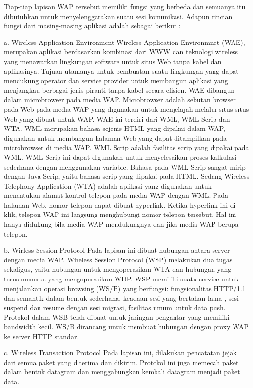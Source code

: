 \documentclass{jtetiproposalskripsi}
\begin{document}
Tiap-tiap lapisan WAP tersebut memiliki fungsi yang berbeda dan semuanya itu dibutuhkan untuk menyelenggarakan suatu sesi komunikasi. Adapun rincian fungsi dari masing-masing aplikasi adalah sebagai berikut :
	
	
a.	Wireless Application Environment
Wireless Application Environmnet (WAE), merupakan aplikasi berdasarkan kombinasi dari WWW dan teknologi wireless yang menawarkan lingkungan software untuk situs Web tanpa kabel dan aplikasinya. Tujuan utamanya  untuk pembuatan suatu lingkungan yang dapat mendukung operator dan service provider untuk membangun aplikasi yang menjangkau berbagai jenis piranti tanpa kabel secara efisien. WAE dibangun dalam microbrowser pada media WAP. Microbrowser adalah sebutan browser pada Web pada media WAP yang digunakan untuk menjelajah melalui situs-situs Web yang dibuat untuk WAP. WAE ini terdiri dari WML, WML Scrip dan WTA.
WML merupakan bahasa sejenis HTML yang dipakai dalam WAP, digunakan untuk membangun halaman Web yang dapat ditampilkan pada microbrowser di media WAP. WML Scrip adalah fasilitas scrip yang dipakai pada WML. WML Scrip ini dapat digunakan untuk menyelesaikan proses kalkulasi sederhana dengan menggunakan variable.
Bahasa pada WML Scrip sangat mirip dengan Java Scrip, yaitu bahasa scrip yang dipakai pada HTML. Sedang Wireless Telephony Application (WTA) adalah aplikasi yang digunakan untuk menentukan alamat kontrol telepon pada media WAP dengan WML. Pada halaman Web, nomor telepon dapat dibuat hyperlink. Ketika hyperlink ini di klik, telepon WAP ini langsung menghubungi nomor telepon tersebut. Hal ini hanya didukung bila media WAP mendukungnya dan jika media WAP berupa telepon.

b.	Wirless Session Protocol
Pada lapisan ini dibuat hubungan antara server dengan media WAP. Wireless Session Protocol (WSP) melakukan dua tugas sekaligus, yaitu hubungan untuk mengoperasikan WTA dan hubungan yang terus-menerus yang mengoperasikan WDP. WSP memiliki suatu service untuk menjalankan operasi browsing  (WS/B) yang berfungsi: fungsionalitas HTTP/1.1 dan semantik dalam bentuk sederhana, keadaan sesi yang bertahan lama , sesi suspend dan resume dengan sesi migrasi, fasilitas umum untuk data push.
Protokol dalam WSB telah dibuat untuk jaringan pengantar yang memiliki bandwidth kecil. WS/B dirancang untuk membuat hubungan dengan proxy WAP ke server HTTP standar.

c.	Wireless Transaction Protocol
Pada lapisan ini, dilakukan pencatatan jejak dari semua paket yang diterima dan dikirim. Protokol ini juga memecah paket dalam bentuk datagram dan menggabungkan kembali datagram menjadi paket data. 
\end{document}
